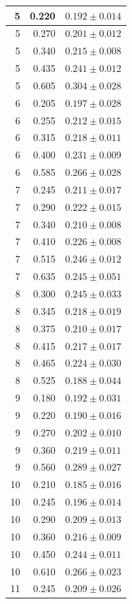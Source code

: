 \begin{longtable}{|r|r|c|}
\hline
5 & 0.220 & $0.192\pm0.014$ \\
\hline
5 & 0.270 & $0.201\pm0.012$ \\
\hline
5 & 0.340 & $0.215\pm0.008$ \\
\hline
5 & 0.435 & $0.241\pm0.012$ \\
\hline
5 & 0.605 & $0.304\pm0.028$ \\
\hline
6 & 0.205 & $0.197\pm0.028$ \\
\hline
6 & 0.255 & $0.212\pm0.015$ \\
\hline
6 & 0.315 & $0.218\pm0.011$ \\
\hline
6 & 0.400 & $0.231\pm0.009$ \\
\hline
6 & 0.585 & $0.266\pm0.028$ \\
\hline
7 & 0.245 & $0.211\pm0.017$ \\
\hline
7 & 0.290 & $0.222\pm0.015$ \\
\hline
7 & 0.340 & $0.210\pm0.008$ \\
\hline
7 & 0.410 & $0.226\pm0.008$ \\
\hline
7 & 0.515 & $0.246\pm0.012$ \\
\hline
7 & 0.635 & $0.245\pm0.051$ \\
\hline
8 & 0.300 & $0.245\pm0.033$ \\
\hline
8 & 0.345 & $0.218\pm0.019$ \\
\hline
8 & 0.375 & $0.210\pm0.017$ \\
\hline
8 & 0.415 & $0.217\pm0.017$ \\
\hline
8 & 0.465 & $0.224\pm0.030$ \\
\hline
8 & 0.525 & $0.188\pm0.044$ \\
\hline
9 & 0.180 & $0.192\pm0.031$ \\
\hline
9 & 0.220 & $0.190\pm0.016$ \\
\hline
9 & 0.270 & $0.202\pm0.010$ \\
\hline
9 & 0.360 & $0.219\pm0.011$ \\
\hline
9 & 0.560 & $0.289\pm0.027$ \\
\hline
10 & 0.210 & $0.185\pm0.016$ \\
\hline
10 & 0.245 & $0.196\pm0.014$ \\
\hline
10 & 0.290 & $0.209\pm0.013$ \\
\hline
10 & 0.360 & $0.216\pm0.009$ \\
\hline
10 & 0.450 & $0.244\pm0.011$ \\
\hline
10 & 0.610 & $0.266\pm0.023$ \\
\hline
11 & 0.245 & $0.209\pm0.026$ \\

\end{longtable}
